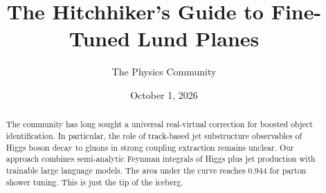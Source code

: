 \documentclass[11pt]{article}
\title{The Hitchhiker's Guide to Fine-Tuned Lund Planes}
\author{The Physics Community}
\date{October 1, 2026}
\numberwithin{equation}{section}
\theoremstyle{definition}
\theoremstyle{remark}
\begin{document}
\maketitle
\begin{abstract}
The community has long sought a universal real-virtual correction for
boosted object identification. In particular, the role of track-based
jet substructure observables of Higgs boson decay to gluons in strong
coupling extraction remains unclear. Our approach combines semi-analytic
Feynman integrals of Higgs plus jet production with trainable large
language models. The area under the curve reaches 0.944 for parton
shower tuning. This is just the tip of the iceberg.
\end{abstract}
\tableofcontents




\nocite{*}


\end{document}
